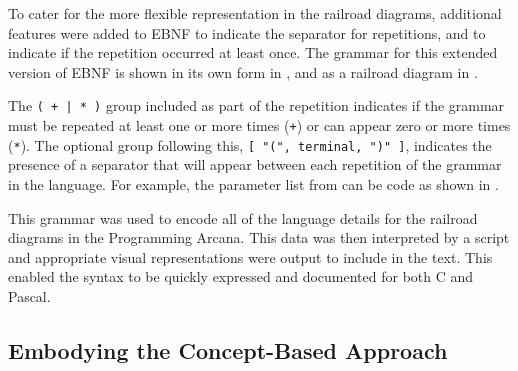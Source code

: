 

\clearpage
To cater for the more flexible representation in the railroad diagrams, additional features were added to EBNF to indicate the separator for repetitions, and to indicate if the repetition occurred at least once. The grammar for this extended version of EBNF is shown in its own form in , and as a railroad diagram in .



The \texttt{( + | * )} group included as part of the repetition indicates if the grammar must be repeated at least one or more times (\texttt{+}) or can appear zero or more times (\texttt{*}). The optional group following this, \texttt{[ "(", terminal, ")" ]}, indicates the presence of a separator that will appear between each repetition of the grammar in the language. For example, the parameter list from  can be code as shown in .


This grammar was used to encode all of the language details for the railroad diagrams in the Programming Arcana. This data was then interpreted by a script and appropriate visual representations were output to include in the text. This enabled the syntax to be quickly expressed and documented for both C and Pascal.

\clearpage
\subsection{Embodying the Concept-Based Approach} %
\label{ssub:arcana_summary}

